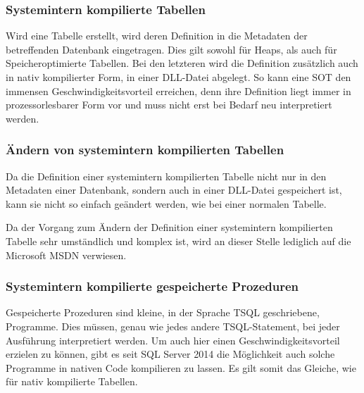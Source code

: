         \subsubsection{Systemintern kompilierte Tabellen}
          Wird eine Tabelle erstellt, wird deren Definition in die Metadaten der
          betreffenden Datenbank eingetragen. Dies gilt sowohl für Heaps, als
          auch für Speicheroptimierte Tabellen. Bei den letzteren wird die
          Definition zusätzlich auch in nativ kompilierter Form, in einer
          DLL-Datei abgelegt. So kann eine SOT den immensen
          Geschwindigkeitsvorteil erreichen, denn ihre Definition liegt immer in
          prozessorlesbarer Form vor und muss nicht erst bei Bedarf neu
          interpretiert werden.
        \subsubsection{Ändern von systemintern kompilierten Tabellen}
          Da die Definition einer systemintern kompilierten Tabelle nicht nur in
          den Metadaten einer Datenbank, sondern auch in einer DLL-Datei
          gespeichert ist, kann sie nicht so einfach geändert werden, wie bei
          einer normalen Tabelle.
          
          Da der Vorgang zum Ändern der Definition einer systemintern
          kompilierten Tabelle sehr umständlich und komplex ist, wird an dieser
          Stelle lediglich auf die Microsoft MSDN verwiesen.
          \begin{literaturinternet}
            \item \cite{dn269114}
          \end{literaturinternet}                   
        \subsubsection{Systemintern kompilierte gespeicherte Prozeduren}
          Gespeicherte Prozeduren sind kleine, in der Sprache TSQL geschriebene,
          Programme. Dies müssen, genau wie jedes andere TSQL-Statement, bei
          jeder Ausführung interpretiert werden. Um auch hier einen
          Geschwindigkeitsvorteil erzielen zu können, gibt es seit SQL Server
          2014 die Möglichkeit auch solche Programme in nativen Code kompilieren
          zu lassen. Es gilt somit das Gleiche, wie für nativ kompilierte
          Tabellen.
         
